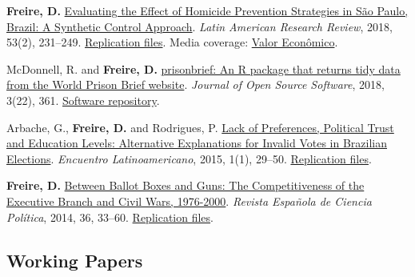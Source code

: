 \documentclass[a4paper]{article}
\renewenvironment{itemize}{
	\begin{list}{}{
			\setlength{\leftmargin}{1.5em}
		}
		}{
	\end{list}
}
\begin{document}
\begin{itemize}
\item \textbf{Freire, D.} \href{https://doi.org/10.25222/larr.334}{Evaluating the Effect of Homicide Prevention Strategies in São Paulo, Brazil: A Synthetic Control Approach}. \textit{Latin American Research Review}, 2018, 53(2), 231--249. \href{https://github.com/danilofreire/homicides-sp-synth}{Replication files}. Media coverage: \href{http://www.valor.com.br/cultura/5111524/sangue-no-asfalto}{Valor Econômico}.
\item McDonnell, R. and \textbf{Freire, D.} \href{https://doi.org/10.21105/joss.00361}{prisonbrief: An R package that returns tidy data from the World Prison Brief website}. \textit{Journal of Open Source Software}, 2018, 3(22), 361. \href{https://github.com/danilofreire/prisonbrief}{Software repository}.
\item Arbache, G., \textbf{Freire, D.} and Rodrigues, P. \href{http://www.iapss.org/wp-content/uploads/2014/10/ELA1.1_2.Lack-of-Preferences-Political-Trust-and-Education-Levels.pdf}{Lack of Preferences, Political Trust and Education Levels: Alternative Explanations for Invalid Votes in Brazilian Elections}. \textit{Encuentro Latinoamericano}, 2015, 1(1), 29--50. \href{https://github.com/danilofreire/invalid-votes-brazil}{Replication files}.
\item \textbf{Freire, D.} \href{http://recyt.fecyt.es/index.php/recp/article/view/37638}{Between Ballot Boxes and Guns: The Competitiveness of the Executive Branch and Civil Wars, 1976-2000}. \textit{Revista Española de Ciencia Política}, 2014, 36, 33--60. \href{https://doi.org/10.7910/DVN/NSDUYG}{Replication files}.
\end{itemize}

\subsection*{Working Papers}
\end{document}
